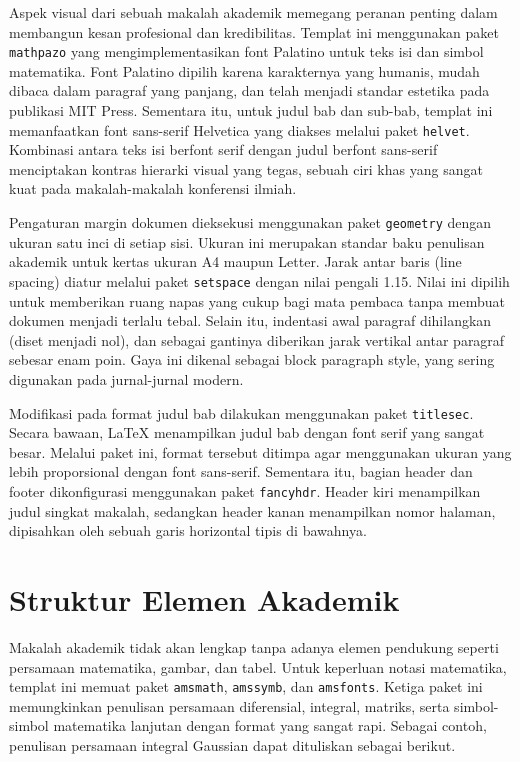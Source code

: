 \documentclass[11pt,a4paper]{article}
\begin{document}
	Aspek visual dari sebuah makalah akademik memegang peranan penting dalam membangun kesan profesional dan kredibilitas. Templat ini menggunakan paket \texttt{mathpazo} yang mengimplementasikan font Palatino untuk teks isi dan simbol matematika. Font Palatino dipilih karena karakternya yang humanis, mudah dibaca dalam paragraf yang panjang, dan telah menjadi standar estetika pada publikasi MIT Press. Sementara itu, untuk judul bab dan sub-bab, templat ini memanfaatkan font sans-serif Helvetica yang diakses melalui paket \texttt{helvet}. Kombinasi antara teks isi berfont serif dengan judul berfont sans-serif menciptakan kontras hierarki visual yang tegas, sebuah ciri khas yang sangat kuat pada makalah-makalah konferensi ilmiah.
	
	Pengaturan margin dokumen dieksekusi menggunakan paket \texttt{geometry} dengan ukuran satu inci di setiap sisi. Ukuran ini merupakan standar baku penulisan akademik untuk kertas ukuran A4 maupun Letter. Jarak antar baris (line spacing) diatur melalui paket \texttt{setspace} dengan nilai pengali 1.15. Nilai ini dipilih untuk memberikan ruang napas yang cukup bagi mata pembaca tanpa membuat dokumen menjadi terlalu tebal. Selain itu, indentasi awal paragraf dihilangkan (diset menjadi nol), dan sebagai gantinya diberikan jarak vertikal antar paragraf sebesar enam poin. Gaya ini dikenal sebagai block paragraph style, yang sering digunakan pada jurnal-jurnal modern.
	
	Modifikasi pada format judul bab dilakukan menggunakan paket \texttt{titlesec}. Secara bawaan, LaTeX menampilkan judul bab dengan font serif yang sangat besar. Melalui paket ini, format tersebut ditimpa agar menggunakan ukuran yang lebih proporsional dengan font sans-serif. Sementara itu, bagian header dan footer dikonfigurasi menggunakan paket \texttt{fancyhdr}. Header kiri menampilkan judul singkat makalah, sedangkan header kanan menampilkan nomor halaman, dipisahkan oleh sebuah garis horizontal tipis di bawahnya.
	
	\section{Struktur Elemen Akademik}
	
	Makalah akademik tidak akan lengkap tanpa adanya elemen pendukung seperti persamaan matematika, gambar, dan tabel. Untuk keperluan notasi matematika, templat ini memuat paket \texttt{amsmath}, \texttt{amssymb}, dan \texttt{amsfonts}. Ketiga paket ini memungkinkan penulisan persamaan diferensial, integral, matriks, serta simbol-simbol matematika lanjutan dengan format yang sangat rapi. Sebagai contoh, penulisan persamaan integral Gaussian dapat dituliskan sebagai berikut.
	
\end{document}
